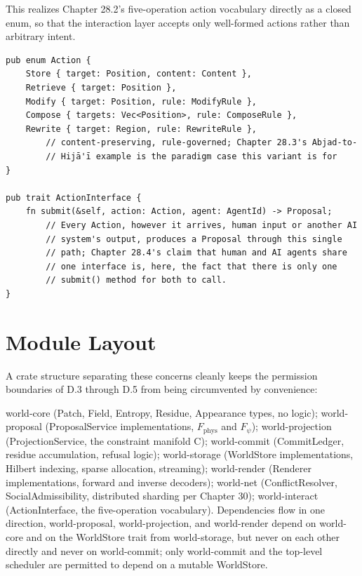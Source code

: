 This realizes Chapter 28.2's five-operation action vocabulary directly as a closed enum, so that the interaction layer accepts only well-formed actions rather than arbitrary intent.

\begin{Verbatim}[breaklines=true, breaksymbolleft={}, fontsize=\small]
pub enum Action {
    Store { target: Position, content: Content },
    Retrieve { target: Position },
    Modify { target: Position, rule: ModifyRule },
    Compose { targets: Vec<Position>, rule: ComposeRule },
    Rewrite { target: Region, rule: RewriteRule },
        // content-preserving, rule-governed; Chapter 28.3's Abjad-to-
        // Hijā'ī example is the paradigm case this variant is for
}

pub trait ActionInterface {
    fn submit(&self, action: Action, agent: AgentId) -> Proposal;
        // Every Action, however it arrives, human input or another AI
        // system's output, produces a Proposal through this single
        // path; Chapter 28.4's claim that human and AI agents share
        // one interface is, here, the fact that there is only one
        // submit() method for both to call.
}
\end{Verbatim}

\section{Module Layout}

A crate structure separating these concerns cleanly keeps the permission boundaries of D.3 through D.5 from being circumvented by convenience:

world-core (Patch, Field, Entropy, Residue, Appearance types, no logic); world-proposal (ProposalService implementations, \(F_{\mathrm{phys}}\) and \(F_\psi\)); world-projection (ProjectionService, the constraint manifold C); world-commit (CommitLedger, residue accumulation, refusal logic); world-storage (WorldStore implementations, Hilbert indexing, sparse allocation, streaming); world-render (Renderer implementations, forward and inverse decoders); world-net (ConflictResolver, SocialAdmissibility, distributed sharding per Chapter 30); world-interact (ActionInterface, the five-operation vocabulary). Dependencies flow in one direction, world-proposal, world-projection, and world-render depend on world-core and on the WorldStore trait from world-storage, but never on each other directly and never on world-commit; only world-commit and the top-level scheduler are permitted to depend on a mutable WorldStore.

